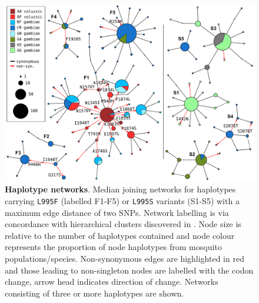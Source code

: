 \documentclass[a4paper,11pt,abstracton,hidelinks]{scrartcl}
\begin{document}
%
\begin{figure}[!t]
  \includegraphics[width=1.1\linewidth,center]{artwork/complete_networks.pdf}
  \caption{\textbf{Haplotype networks}. Median joining networks for haplotypes carrying \texttt{L995F} (labelled F1-F5) or \texttt{L995S} variants (S1-S5) with a maximum edge distance of two SNPs. Network labelling is via concordance with hierarchical clusters discovered in \cite{Ag1000gConsortium2017}. Node size is relative to the number of haplotypes contained and node colour represents the proportion of node haplotypes from mosquito populations/species. Non-synonymous edges are highlighted in red and those leading to non-singleton nodes are labelled with the codon change, arrow head indicates direction of change. Networks consisting of three or more haplotypes are shown.}
  \label{fig:networks}
\end{figure}
\end{document}
